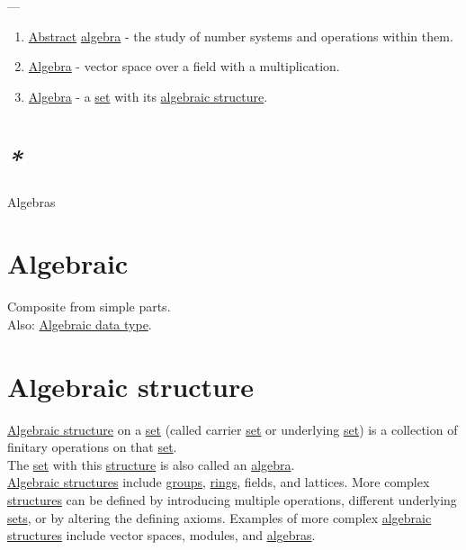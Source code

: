\documentclass[a4paper,14pt,oneside]{book}
\begin{document}
---\\

\begin{enumerate}
\item \hyperref[orgd5905e0]{Abstract} \hyperref[org7783989]{algebra} - the study of number systems and operations within them.\\
\item \hyperref[org7783989]{Algebra} - vector space over a field with a multiplication.\\
\item \hyperref[org7783989]{Algebra} - a \hyperref[org74bf657]{set} with its \hyperref[orgf8454d1]{algebraic structure}.\\
\end{enumerate}

\section{\emph{*}}
\label{sec:org4500158}

\label{org74b0e01}Algebras\\

\section{\label{org11f1673}Algebraic}
\label{sec:orgb756caf}
Composite from simple parts.\\
Also: \hyperref[orgd9be4be]{Algebraic data type}.\\

\section{\label{orgf8454d1}Algebraic structure}
\label{sec:org341bc6a}
\hyperref[orgf8454d1]{Algebraic structure} on a \hyperref[org74bf657]{set} (called carrier \hyperref[org74bf657]{set} or underlying \hyperref[org74bf657]{set}) is a collection of finitary operations on that \hyperref[org74bf657]{set}.\\
The \hyperref[org74bf657]{set} with this \hyperref[org638bf3c]{structure} is also called an \hyperref[org7783989]{algebra}.\\

\hyperref[orgab80d29]{Algebraic structures} include \hyperref[org615ae87]{groups}, \hyperref[org684b4f5]{rings}, fields, and lattices. More complex \hyperref[org95af9d2]{structures} can be defined by introducing multiple operations, different underlying \hyperref[orgd283771]{sets}, or by altering the defining axioms. Examples of more complex \hyperref[orgab80d29]{algebraic structures} include vector spaces, modules, and \hyperref[org74b0e01]{algebras}.\\
\end{document}

